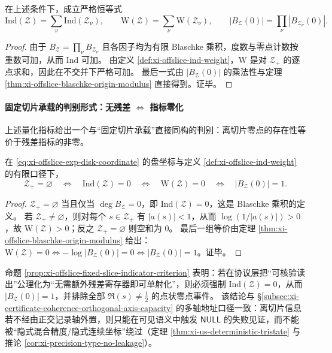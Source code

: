 \begin{theorem}[残差指标可加性]\label{thm:xi-offslice-indicators-additivity}
在上述条件下，成立严格恒等式
\[
\mathrm{Ind}(\mathcal Z)=\sum_{\nu}\mathrm{Ind}(\mathcal Z_{\nu}),
\qquad
\mathrm{W}(\mathcal Z)=\sum_{\nu}\mathrm{W}(\mathcal Z_{\nu}),
\qquad
|B_{\mathcal Z}(0)|=\prod_{\nu}|B_{\mathcal Z_{\nu}}(0)|.
\]
\end{theorem}

\begin{proof}
由于 \(B_{\mathcal Z}=\prod_{\nu}B_{\mathcal Z_\nu}\) 且各因子均为有限 Blaschke 乘积，度数与零点计数按重数可加，从而 \(\mathrm{Ind}\) 可加。
由定义 \ref{def:xi-offslice-ind-weight}，\(\mathrm{W}\) 是对 \(\mathcal Z_{+}\) 的逐点求和，因此在不交并下严格可加。
最后一式由 \(|B_{\mathcal Z}(0)|\) 的乘法性与定理 \ref{thm:xi-offslice-blaschke-origin-modulus} 直接得到。证毕。
\end{proof}

\paragraph{固定切片承载的判别形式：无残差 \texorpdfstring{$\Leftrightarrow$}{<->} 指标零化}
上述量化指标给出一个与“固定切片承载”直接同构的判别：离切片零点的存在性等价于残差指标的非零。

\begin{proposition}[固定切片承载的指标判别]\label{prop:xi-offslice-fixed-slice-indicator-criterion}
在 \eqref{eq:xi-offslice-exp-disk-coordinate} 的盘坐标与定义 \ref{def:xi-offslice-ind-weight} 的有限口径下，
\[
\mathcal Z_{+}=\varnothing
\quad\Longleftrightarrow\quad
\mathrm{Ind}(\mathcal Z)=0
\quad\Longleftrightarrow\quad
\mathrm{W}(\mathcal Z)=0
\quad\Longleftrightarrow\quad
|B_{\mathcal Z}(0)|=1.
\]
\end{proposition}

\begin{proof}
\(\mathcal Z_{+}=\varnothing\) 当且仅当 \(\deg B_{\mathcal Z}=0\)，即 \(\mathrm{Ind}(\mathcal Z)=0\)，这是 Blaschke 乘积的定义。
若 \(\mathcal Z_{+}\neq\varnothing\)，则对每个 \(s\in\mathcal Z_{+}\) 有 \(|a(s)|<1\)，从而 \(\log(1/|a(s)|)>0\)，故 \(\mathrm{W}(\mathcal Z)>0\)；反之 \(\mathcal Z_{+}=\varnothing\) 则空和为 \(0\)。
最后一组等价由定理 \ref{thm:xi-offslice-blaschke-origin-modulus} 给出：\(\mathrm{W}(\mathcal Z)=0\iff -\log|B_{\mathcal Z}(0)|=0\iff |B_{\mathcal Z}(0)|=1\)。证毕。
\end{proof}

\begin{remark}\label{rem:xi-offslice-protocol-consequence}
命题 \ref{prop:xi-offslice-fixed-slice-indicator-criterion} 表明：若在协议层把“可核验读出”公理化为“无需额外残差寄存器即可单射化”，则必须强制 \(\mathrm{Ind}(\mathcal Z)=0\)，从而 \(|B_{\mathcal Z}(0)|=1\)，并排除全部 \(\Re(s)\neq\tfrac12\) 的点状零点事件。
该结论与 \S\ref{subsec:xi-certificate-coherence-orthogonal-axis-capacity} 的多轴地址口径一致：离切片信息若不经由正交记录轴外置，则只能在可见语义中触发 \(\mathsf{NULL}\) 的失败见证，而不能被“隐式混合精度/隐式连续坐标”绕过（定理 \ref{thm:xi-us-deterministic-tristate} 与推论 \ref{cor:xi-precision-type-no-leakage}）。
\end{remark}

\endinput
